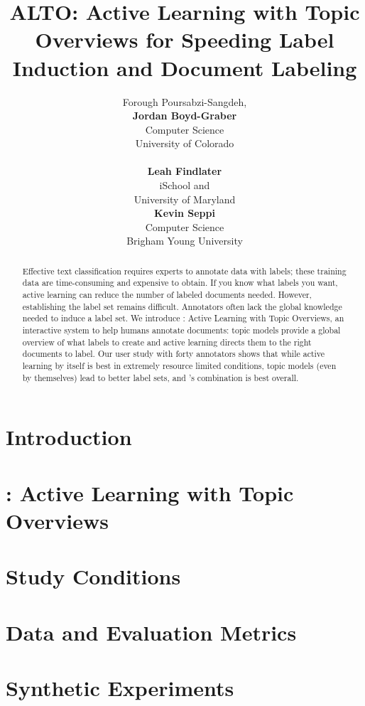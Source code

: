 \documentclass[11pt]{article}
\title{ALTO: Active Learning with Topic Overviews for Speeding Label Induction and Document Labeling}
\author{Forough Poursabzi-Sangdeh, \\
              {\bf Jordan Boyd-Graber} \\
              Computer Science \\
	     University of Colorado\\
	    \smalltt{forough.poursabzisangdeh@colorado.edu} \\
	    \smalltt{Jordan.Boyd.Graber@colorado.edu}
	\And
	 {\bf Leah Findlater}\\
         iSchool and \abr{umiacs} \\
	 University of Maryland\\
	\smalltt{leahkf@umd.edu}
	\And
	 {\bf Kevin Seppi} \\
         Computer Science \\
	 Brigham Young University\\
	\smalltt{kseppi@cs.byu.edu}
	}
\newcommand{\name}[0]{\abr{alto}}
\begin{document}
\maketitle

\begin{abstract}
  Effective text classification requires experts to annotate data with
  labels; these training data are time-consuming and expensive to
  obtain. If you know what labels you want, active learning can reduce
  the number of labeled documents needed.  However, establishing the label
  set remains difficult. Annotators often lack the global knowledge
  needed to induce a label set.  We introduce \name{}: Active Learning
  with Topic Overviews, an interactive system to help humans annotate
  documents: topic models provide a global overview of what labels to
  create and active learning directs them to the right documents to
  label.  Our user study with forty annotators shows that while active
  learning by itself is best in extremely resource limited conditions,
  topic models (even by themselves) lead to better label sets, and
  \name{}'s combination is best overall.
\end{abstract}

\section{Introduction}
\label{sec:introduction} 

\section{\name{}: Active Learning with Topic Overviews}
\label{sec:ALTO} 

\section{Study Conditions}
\label{sec:conditions} 

\section{Data and Evaluation Metrics}
\label{sec:data_metrics} 

\section{Synthetic Experiments}
\label{sec:synthetic_exp}
\end{document}
